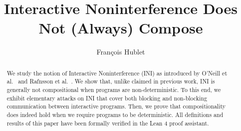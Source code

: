 \documentclass[preprint,5p,twocolumn]{elsarticle}
\begin{document}
\begin{frontmatter}



\title{Interactive Noninterference Does Not (Always) Compose}


\author[inst1]{François Hublet}

\begin{abstract}
  We study the notion of Interactive Noninterference (INI) as introduced by
  O'Neill et al.~\cite{ONeill2006} and Rafnsson et al.~\cite{Rafnsson2012}.
  We show that, unlike claimed in previous work, INI is generally not compositional when
  programs are non-deterministic. To this end, we exhibit elementary attacks on INI that cover
  both blocking and non-blocking communication between interactive programs. Then, we
  prove that compositionality does indeed hold when we require programs to be deterministic.
  All definitions and results of this paper have been formally verified in the Lean 4 proof assistant.
\end{abstract}


\end{frontmatter}
\end{document}

